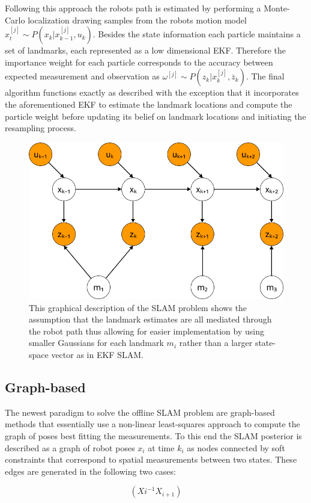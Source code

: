 Following this approach the robots path is estimated by performing a Monte-Carlo localization drawing samples from the robots motion model $x_{t}^{[j]} \sim P(x_{k} | x_{k-1}^{[j]}, u_{k}) $. Besides the state information each particle maintains a set of landmarks, each represented as a low dimensional EKF. Therefore the importance weight for each particle corresponds to the accuracy between expected measurement and observation as $ \omega^{[j]} \sim P(z_{k} | x_{k}^{[j]}, \overline{z}_{k}) $.
The final algorithm functions exactly as described with the exception that it incorporates the aforementioned EKF to estimate the landmark locations and compute the particle weight before updating its belief on landmark locations and initiating the resampling process. 


\begin{figure}
	\centering
	\includegraphics[width=0.5\linewidth]{img/FastSlamGraphical}
	\caption{
		This graphical description of the SLAM problem shows the assumption that the landmark estimates are all mediated through the robot path thus allowing for easier implementation by using smaller Gaussians for each landmark $m_{i}$ rather than a larger state-space vector as in EKF SLAM.
	}
	\label{fig:fastSlamGraphical}
\end{figure}

\subsection{Graph-based}
The newest paradigm to solve the offline SLAM problem are graph-based methods that essentially use a non-linear least-squares approach to compute the graph of poses best fitting the measurements. 
To this end the SLAM posterior is described as a graph of robot poses $ x_{i} $ at time $ k_{i} $ as nodes connected by soft constraints that correspond to spatial measurements between two states.
These edges are generated in the following two cases:

\begin{equation}\label{odometryEdge}
	(X{i}^{-1}X_{i+1})
\end{equation}

